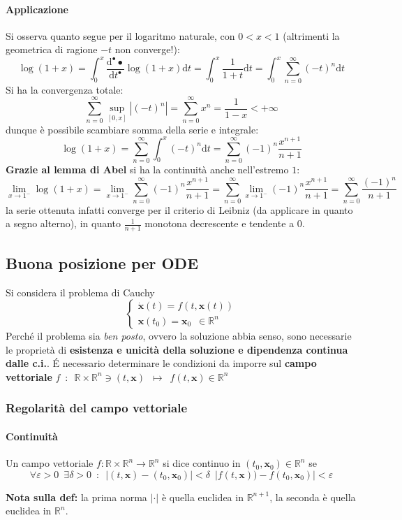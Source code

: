 \documentclass[10pt]{article}
\theoremstyle{plain}
\begin{document}
\paragraph{Applicazione}
Si osserva quanto segue per il logaritmo naturale, con $0 < x < 1$ (altrimenti la geometrica di ragione $-t$ non converge!):
\[ \log(1+x) = \int_{0}^{x}\frac{\textrm{d}^{•} •}{\textrm{d}t^{•}} \log(1+x)\textrm{d}t = \int_{0}^{x}\frac{1}{1+t}\textrm{d}t = \int_0^x \sum\limits_{n=0}^\infty (-t)^n \textrm{d}t\]
Si ha la convergenza totale:
\[\sum\limits_{n=0}^\infty \sup\limits_{[0,x]} |(-t)^n| = \sum\limits_{n=0}^\infty x^n = \frac{1}{1-x} < +\infty\]
dunque è possibile scambiare somma della serie e integrale:
\[\log(1+x) = \sum\limits_{n=0}^\infty \int_{0}^{x}(-t)^n\textrm{d}t = \sum\limits_{n=0}^\infty (-1)^n \frac{x^{n+1}}{n+1}\]
\textbf{Grazie al lemma di Abel} si ha la continuità anche nell'estremo $1$:
\[\lim\limits_{x \rightarrow 1^-} \log(1+x) = \lim\limits_{x \rightarrow 1^-} \sum\limits_{n=0}^\infty (-1)^n \frac{x^{n+1}}{n+1} = \sum\limits_{n=0}^\infty \lim\limits_{x \rightarrow 1^-} (-1)^n \frac{x^{n+1}}{n+1} = \sum\limits_{n=0}^\infty \frac{(-1)^n}{n+1}\]
la serie ottenuta infatti converge per il criterio di Leibniz (da applicare in quanto a segno alterno), in quanto $\frac{1}{n+1}$ monotona decrescente e tendente a $0$.

\subsection{Buona posizione per ODE}
Si considera il problema di Cauchy
\[\begin{cases}
\dot{\mathbf{x}}(t) = f(t, \mathbf{x}(t))\\
\mathbf{x}(t_0) = \mathbf{x}_0 \enspace \in \mathbb{R}^n
\end{cases}\]
Perché il problema sia \textit{ben posto}, ovvero la soluzione abbia senso, sono necessarie le proprietà di \textbf{esistenza e unicità della soluzione e dipendenza continua dalle c.i.}. \'E necessario determinare le condizioni da imporre sul \textbf{campo vettoriale} $\displaystyle f \enspace : \enspace \mathbb{R} \times \mathbb{R}^n \owns (t, \mathbf{x}) \enspace \longmapsto \enspace f(t, \mathbf{x}) \in \mathbb{R}^n$

\subsubsection{Regolarità del campo vettoriale}

\paragraph{Continuità} 
\begin{defin}
Un campo vettoriale $\displaystyle f : \mathbb{R} \times \mathbb{R}^n \rightarrow \mathbb{R}^n$ si dice continuo in $(t_0, \mathbf{x}_0) \in \mathbb{R}^n$ se 
\[\forall \varepsilon > 0 \enspace \exists \delta > 0 \enspace : \enspace |(t,\mathbf{x}) - (t_0, \mathbf{x}_0)| < \delta \enspace |f(t,\mathbf{x})) - f(t_0, \mathbf{x}_0)| < \varepsilon\]
\end{defin}
\textbf{Nota sulla def:} la prima norma $|\cdot|$ è quella euclidea in $\mathbb{R}^{n+1}$, la seconda è quella euclidea in $\mathbb{R}^n$.
\end{document}
